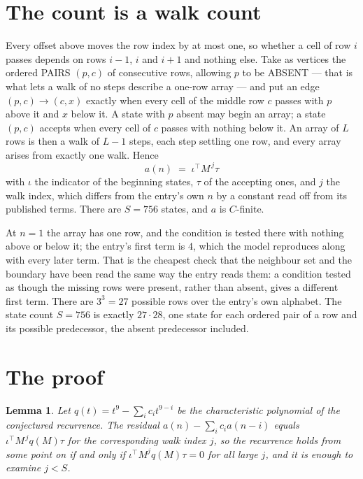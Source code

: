 \documentclass[11pt,a4paper]{article}
\theoremstyle{plain}
\newtheorem{lemma}[theorem]{Lemma}
\theoremstyle{definition}
\begin{document}
\section{The count is a walk count}

Every offset above moves the row index by at most one, so whether a cell of row $i$ passes
depends on rows $i-1$, $i$ and $i+1$ and nothing else. Take as vertices the ordered PAIRS
$(p,c)$ of consecutive rows, allowing $p$ to be ABSENT --- that is what lets a walk of no steps
describe a one-row array --- and put an edge $(p,c)\to(c,x)$ exactly when every cell of the
middle row $c$ passes with $p$ above it and $x$ below it. A state with $p$ absent may begin an
array; a state $(p,c)$ accepts when every cell of $c$ passes with nothing below it. An array of
$L$ rows is then a walk of $L-1$ steps, each step settling one row, and every array arises from
exactly one walk. Hence
\[
a(n)\;=\;\iota^{\!\top}M^{\,j}\tau
\]
with $\iota$ the indicator of the beginning states, $\tau$ of the accepting ones, and $j$ the
walk index, which differs from the entry's own $n$ by a constant read off from its published
terms. There are $S=756$ states, and $a$ is $C$-finite.

At $n=1$ the array has one row, and
the condition is tested there with nothing above or below it; the entry's first term is
$4$, which the model reproduces along with every later term. That is the cheapest check
that the neighbour set and the boundary have been read the same way the entry reads them: a
condition tested as though the missing rows were present, rather than absent, gives a different
first term. There are $3^{3}=27$ possible rows over the entry's own alphabet. The state count $S=756$ is exactly $27\cdot28$,
one state for each ordered pair of a row and its possible predecessor, the absent predecessor
included.

\section{The proof}

\begin{lemma}\label{lem:crit}
Let $q(t)=t^{9}-\sum_i c_it^{9-i}$ be the characteristic polynomial of the
conjectured recurrence. The residual $a(n)-\sum_ic_ia(n-i)$ equals
$\iota^{\!\top}M^{\,j}q(M)\tau$ for the corresponding walk index $j$, so the recurrence
holds from some point on if and only if $\iota^{\!\top}M^{j}q(M)\tau=0$ for all large $j$,
and it is enough to examine $j<S$.
\end{lemma}
\end{document}
